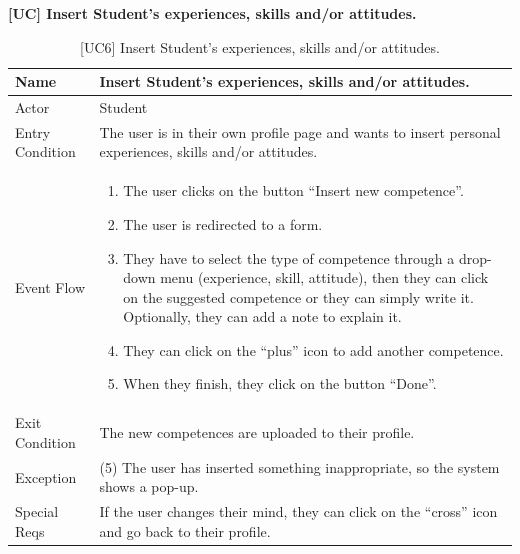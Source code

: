 \textbf{[UC\nextUseCases] Insert Student’s experiences, skills and/or attitudes.}
\begin{table}[H] %
    \centering
    \begin{tabular}{|p{3cm}|p{10cm}|}
    \hline
    Name & Insert Student’s experiences, skills and/or attitudes. \\ \hline
    Actor  & Student \\ \hline
    Entry Condition  & The user is in their own profile page and wants to insert personal experiences, skills and/or attitudes. \\ \hline
    Event Flow  & 
    \begin{enumerate}[noitemsep, topsep=0pt]
        \item The user clicks on the button “Insert new competence”.
        \item The user is redirected to a form.
        \item They have to select the type of competence through a drop-down menu (experience, skill, attitude), then they can click on the suggested competence or they can simply write it. Optionally, they can add a note to explain it.
        \item They can click on the “plus” icon to add another competence.
        \item When they finish, they click on the button “Done”.
    \end{enumerate}
    \\ \hline
    Exit Condition  & The new competences are uploaded to their profile. \\ \hline
    Exception  & (5) The user has inserted something inappropriate, so the system shows a pop-up. \\ \hline
    Special Reqs  & If the user changes their mind, they can click on the “cross” icon and go back to their profile. \\ \hline
    \end{tabular}
    \caption{[UC6] Insert Student’s experiences, skills and/or attitudes.}
\end{table}

